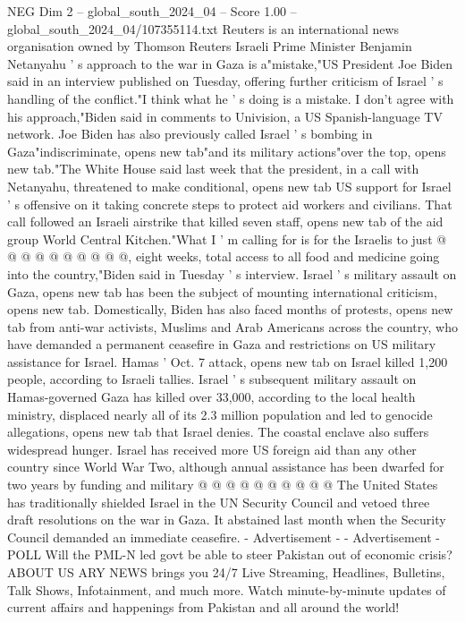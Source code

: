 \begin{textsample}{NEG Dim 2 – global\_south\_2024\_04 – Score 1.00 – global\_south\_2024\_04/107355114.txt}  \label{ex:f2_neg_403}
Reuters is an international news organisation owned by Thomson Reuters Israeli Prime Minister Benjamin Netanyahu ' s approach to the war in Gaza is a"mistake,"US President Joe Biden said in an interview published on Tuesday, offering further criticism of Israel ' s handling of the conflict."I think what he ' s doing is a mistake.
I don't agree with his approach,"Biden said in comments to Univision, a US Spanish-language TV network.
Joe Biden has also previously called Israel ' s bombing in Gaza"indiscriminate, opens new tab"and its military actions"over the top, opens new tab."The White House said last week that the president, in a call with Netanyahu, threatened to make conditional, opens new tab US support for Israel ' s offensive on it taking concrete steps to protect aid workers and civilians.
That call followed an Israeli airstrike that killed seven staff, opens new tab of the aid group World Central Kitchen."What I ' m calling for is for the Israelis to just @ @ @ @ @ @ @ @ @ @, eight weeks, total access to all food and medicine going into the country,"Biden said in Tuesday ' s interview.
Israel ' s military assault on Gaza, opens new tab has been the subject of mounting international criticism, opens new tab.
Domestically, Biden has also faced months of protests, opens new tab from anti-war activists, Muslims and Arab Americans across the country, who have demanded a permanent ceasefire in Gaza and restrictions on US military assistance for Israel.
Hamas ' Oct. 7 attack, opens new tab on Israel killed 1,200 people, according to Israeli tallies.
Israel ' s subsequent military assault on Hamas-governed Gaza has killed over 33,000, according to the local health ministry, displaced nearly all of its 2.3 million population and led to genocide allegations, opens new tab that Israel denies.
The coastal enclave also suffers widespread hunger.
Israel has received more US foreign aid than any other country since World War Two, although annual assistance has been dwarfed for two years by funding and military @ @ @ @ @ @ @ @ @ @ The United States has traditionally shielded Israel in the UN Security Council and vetoed three draft resolutions on the war in Gaza.
It abstained last month when the Security Council demanded an immediate ceasefire. - Advertisement - - Advertisement - POLL Will the PML-N led govt be able to steer Pakistan out of economic crisis?
ABOUT US ARY NEWS brings you 24/7 Live Streaming, Headlines, Bulletins, Talk Shows, Infotainment, and much more.
Watch minute-by-minute updates of current affairs and happenings from Pakistan and all around the world!

\end{textsample}
